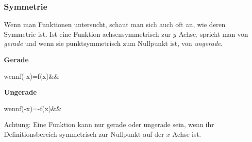 \documentclass[12pt]{article}
\begin{document}
				\subsubsection{Symmetrie}
				\label{subsubsec:symmetrie}
				Wenn man Funktionen untersucht, schaut man sich auch oft an, wie deren Symmetrie ist. Ist eine Funktion achsensymmetrisch zur $y$-Achse, spricht man von \textit{gerade} und wenn sie punktsymmetrisch zum Nullpunkt ist, von \textit{ungerade}.
				\begin{tcolorbox}[boxsep=0pt,top=1cm,left=1cm,right=1cm, bottom=.75cm,arc=0pt,auto outer arc,colback=white,colframe=black, enlarge top by=.25cm, enlarge bottom by=.25cm]
					\textbf{Gerade}
					\begin{flalign*}
					wenn\;f(-x)=f(x)&&
					\end{flalign*}
					\textbf{Ungerade}
					\begin{flalign*}
					wenn\;f(-x)=-f(x)&&
					\end{flalign*}
				\end{tcolorbox}
				\noindent Achtung: Eine Funktion kann nur gerade oder ungerade sein, wenn ihr Definitionsbereich symmetrisch zur Nullpunkt auf der $x$-Achse ist.
\end{document}
